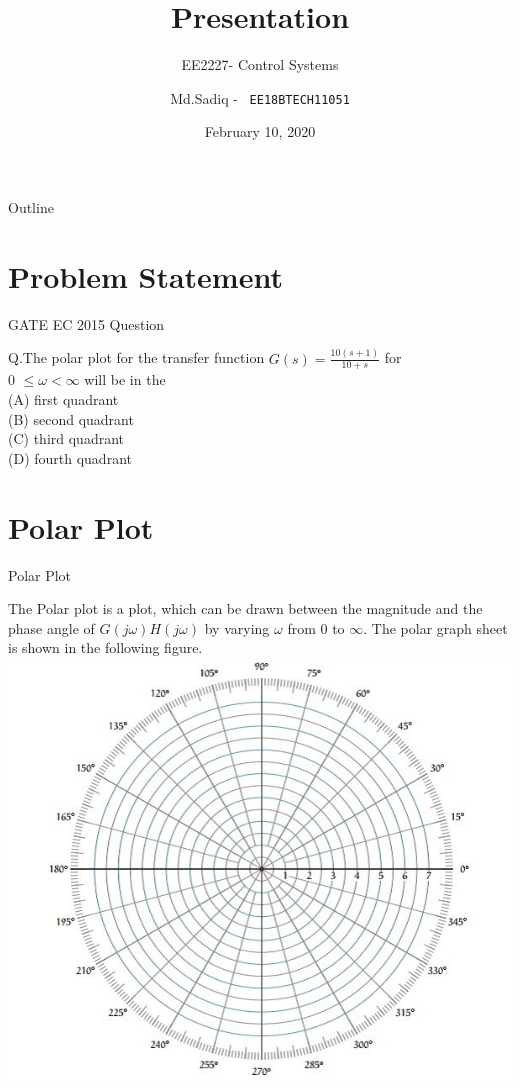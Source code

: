 \documentclass{beamer}
\title{Presentation}
\subtitle{EE2227- Control Systems}
\author{
Md.Sadiq -  \
\texttt{EE18BTECH11051}
}
\institute{IIT HYDERABAD}
\date{February 10, 2020}
\begin{document}
\begin{frame}
  \titlepage
\end{frame}

\begin{frame}{Outline}
  \tableofcontents
\end{frame}

\section{Problem Statement}

\begin{frame}{GATE EC 2015 Question}
 
 
   Q.The polar plot for the transfer function $ G(s) = \frac{10(s+1)}{10+s}$ for \\0 $\leq \omega < \infty$ will be in the \\
  (A) first quadrant\\
  (B) second quadrant\\
  (C) third quadrant\\
  (D) fourth quadrant\\
\end{frame}

\section{Polar Plot}

\begin{frame}{Polar Plot}

\begin{centre}

    The Polar plot is a plot, which can be drawn between the magnitude and the phase angle of $G(j\omega)H(j\omega)$ by varying $\omega$ from 0 to $\infty$. The polar graph sheet is shown in the following figure.
    \includegraphics[scale =0.45]{Figure1.jpg}
\end{centre}



\end{frame}
\end{document}
